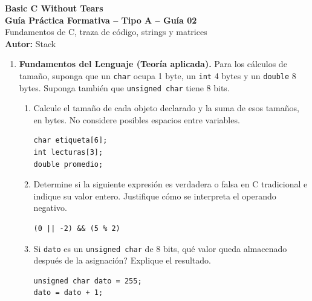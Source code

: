 \documentclass[11pt,letterpaper]{article}
\begin{document}
\begin{center}
    {\LARGE \textbf{Basic C Without Tears}} \\[0.25cm]
    {\Large \textbf{Guía Práctica Formativa -- Tipo A -- Guía 02}} \\[0.15cm]
    \small Fundamentos de C, traza de código, strings y matrices \\[0.1cm]
    \textbf{Autor:} Stack
\end{center}
\vspace{0.3cm}

\begin{enumerate}[label=\textbf{\arabic*.}]
    \item \textbf{Fundamentos del Lenguaje (Teoría aplicada).}
    Para los cálculos de tamaño, suponga que un \texttt{char} ocupa 1 byte, un \texttt{int} 4 bytes y un \texttt{double} 8 bytes. Suponga también que \texttt{unsigned char} tiene 8 bits.
    \begin{enumerate}[label=(\alph*)]
        \item Calcule el tamaño de cada objeto declarado y la suma de esos tamaños, en bytes. No considere posibles espacios entre variables.
        \begin{lstlisting}[style=customc,numbers=none]
char etiqueta[6];
int lecturas[3];
double promedio;
        \end{lstlisting}
        \par\vspace{1.5cm}
        \item Determine si la siguiente expresión es verdadera o falsa en C tradicional e indique su valor entero. Justifique cómo se interpreta el operando negativo.
        \begin{lstlisting}[style=customc,numbers=none]
(0 || -2) && (5 % 2)
        \end{lstlisting}
        \par\vspace{1.5cm}
        \item Si \texttt{dato} es un \texttt{unsigned char} de 8 bits, \textquestiondown{}qué valor queda almacenado después de la asignación? Explique el resultado.
        \begin{lstlisting}[style=customc]
unsigned char dato = 255;
dato = dato + 1;
        \end{lstlisting}
        \par\vspace{1.5cm}
    \end{enumerate}


\end{enumerate}
\end{document}
